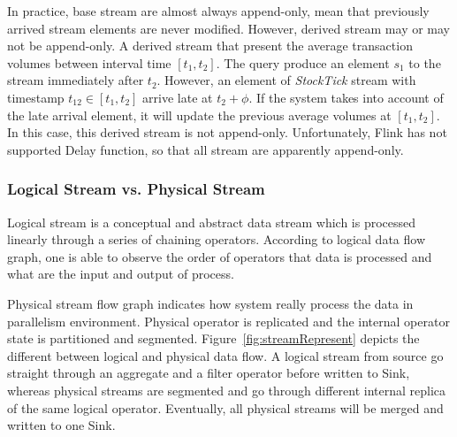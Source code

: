In practice, base stream are almost always append-only, mean that previously arrived stream elements are never modified. However, derived stream may or may not be append-only\cite{Golab:2010}. A derived stream that present the average transaction volumes between interval time $[t_1, t_2]$. The query produce an element $s_1$ to the stream immediately after $t_2$. However, an element of \textit{StockTick} stream with timestamp 
$t_{12} \in [t_1,t_2]$ arrive late at $t_2+\phi$. If the system takes into account of the late arrival element, it will update the previous average volumes at $[t_1, t_2]$. In this case, this derived stream is not append-only. Unfortunately, Flink has not supported Delay function, so that all stream are apparently append-only.




\subsubsection*{Logical Stream vs. Physical Stream}

Logical stream is a conceptual and abstract data stream which is processed linearly through a series of chaining operators. According to logical data flow graph, one is able to observe the order of operators that data is processed and what are the input and output of process.

Physical stream flow graph indicates how system really process the data in parallelism environment. Physical operator is replicated and the internal operator state is partitioned and segmented. Figure~\ref{fig:streamRepresent} depicts the different between logical and physical data flow.
A logical stream from source go straight through an aggregate and a filter operator before written to Sink, whereas physical streams are segmented and go through different internal replica of the same logical operator. Eventually, all physical streams will be merged and written to one Sink. 


